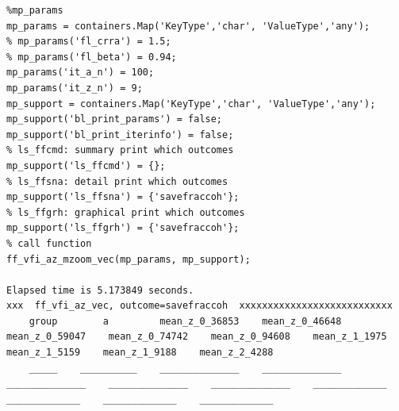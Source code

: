 \documentclass[
]{book}
\begin{document}
\begin{verbatim}
%mp_params
mp_params = containers.Map('KeyType','char', 'ValueType','any');
% mp_params('fl_crra') = 1.5;
% mp_params('fl_beta') = 0.94;
mp_params('it_a_n') = 100;
mp_params('it_z_n') = 9;
mp_support = containers.Map('KeyType','char', 'ValueType','any');
mp_support('bl_print_params') = false;
mp_support('bl_print_iterinfo') = false;
% ls_ffcmd: summary print which outcomes
mp_support('ls_ffcmd') = {};
% ls_ffsna: detail print which outcomes
mp_support('ls_ffsna') = {'savefraccoh'};
% ls_ffgrh: graphical print which outcomes
mp_support('ls_ffgrh') = {'savefraccoh'};
% call function
ff_vfi_az_mzoom_vec(mp_params, mp_support);

Elapsed time is 5.173849 seconds.
xxx  ff_vfi_az_vec, outcome=savefraccoh  xxxxxxxxxxxxxxxxxxxxxxxxxxx
    group        a         mean_z_0_36853    mean_z_0_46648    mean_z_0_59047    mean_z_0_74742    mean_z_0_94608    mean_z_1_1975    mean_z_1_5159    mean_z_1_9188    mean_z_2_4288
    _____    __________    ______________    ______________    ______________    ______________    ______________    _____________    _____________    _____________    _____________


\end{verbatim}
\end{document}
